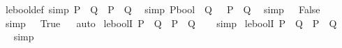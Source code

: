 \begin{isabellebody}
\isanewline
\ \ le{\isacharunderscore}{\kern0pt}bool{\isacharunderscore}{\kern0pt}def\ {\isacharbrackleft}{\kern0pt}simp{\isacharbrackright}{\kern0pt}{\isacharcolon}{\kern0pt}\ {\isachardoublequoteopen}P\ {\isasymle}\ Q\ {\isasymlongleftrightarrow}\ P\ {\isasymlongrightarrow}\ Q{\isachardoublequoteclose}\isanewline
\isanewline
{}\isamarkupfalse%
\isanewline
\ \ {\isacharbrackleft}{\kern0pt}simp{\isacharbrackright}{\kern0pt}{\isacharcolon}{\kern0pt}\ {\isachardoublequoteopen}{\isacharparenleft}{\kern0pt}P{\isacharcolon}{\kern0pt}{\isacharcolon}{\kern0pt}bool{\isacharparenright}{\kern0pt}\ {\isacharless}{\kern0pt}\ Q\ {\isasymlongleftrightarrow}\ {\isasymnot}\ P\ {\isasymand}\ Q{\isachardoublequoteclose}\isanewline
\isanewline
{}\isamarkupfalse%
\isanewline
\ \ {\isacharbrackleft}{\kern0pt}simp{\isacharbrackright}{\kern0pt}{\isacharcolon}{\kern0pt}\ {\isachardoublequoteopen}{\isasymbottom}\ {\isasymlongleftrightarrow}\ False{\isachardoublequoteclose}\isanewline
\isanewline
{}\isamarkupfalse%
\isanewline
\ \ {\isacharbrackleft}{\kern0pt}simp{\isacharbrackright}{\kern0pt}{\isacharcolon}{\kern0pt}\ {\isachardoublequoteopen}{\isasymtop}\ {\isasymlongleftrightarrow}\ True{\isachardoublequoteclose}\isanewline
\isanewline
{}\isamarkupfalse%
%
\isadelimproof
\ %
\endisadelimproof
%
\isatagproof
{}\isamarkupfalse%
\isanewline
{}\isamarkupfalse%
\ auto%
\endisatagproof
{\isafoldproof}%
%
\isadelimproof
%
\endisadelimproof
\isanewline
\isanewline
{}\isamarkupfalse%
\isanewline
\isanewline
{}\isamarkupfalse%
\ le{\isacharunderscore}{\kern0pt}boolI{\isacharcolon}{\kern0pt}\ {\isachardoublequoteopen}{\isacharparenleft}{\kern0pt}P\ {\isasymLongrightarrow}\ Q{\isacharparenright}{\kern0pt}\ {\isasymLongrightarrow}\ P\ {\isasymle}\ Q{\isachardoublequoteclose}\isanewline
%
\isadelimproof
\ \ %
\endisadelimproof
%
\isatagproof
{}\isamarkupfalse%
\ simp%
\endisatagproof
{\isafoldproof}%
%
\isadelimproof
\isanewline
%
\endisadelimproof
\isanewline
{}\isamarkupfalse%
\ le{\isacharunderscore}{\kern0pt}boolI{\isacharprime}{\kern0pt}{\isacharcolon}{\kern0pt}\ {\isachardoublequoteopen}P\ {\isasymlongrightarrow}\ Q\ {\isasymLongrightarrow}\ P\ {\isasymle}\ Q{\isachardoublequoteclose}\isanewline
%
\isadelimproof
\ \ %
\endisadelimproof
%
\isatagproof
{}\isamarkupfalse%
\ simp%
\endisatagproof
{\isafoldproof}%
%
\isadelimproof
\isanewline
%
\endisadelimproof
\isanewline
{}\isamarkupfalse%

\end{isabellebody}
